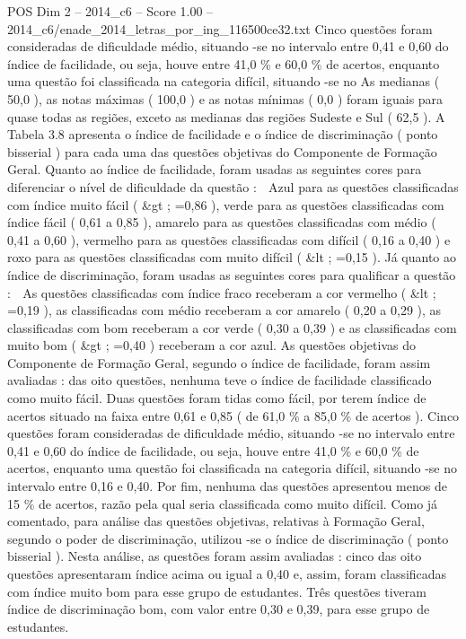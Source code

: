 \begin{textsample}{POS Dim 2 – 2014\_c6 – Score 1.00 – 2014\_c6/enade\_2014\_letras\_por\_ing\_116500ce32.txt}
Cinco questões foram consideradas de dificuldade médio, situando -se no intervalo entre 0,41 e 0,60 do índice de facilidade, ou seja, houve entre 41,0 \% e 60,0 \% de acertos, enquanto uma questão foi classificada na categoria difícil, situando -se no As medianas ( 50,0 ), as notas máximas ( 100,0 ) e as notas mínimas ( 0,0 ) foram iguais para quase todas as regiões, exceto as medianas das regiões Sudeste e Sul ( 62,5 ).
A Tabela 3.8 apresenta o índice de facilidade e o índice de discriminação ( ponto bisserial ) para cada uma das questões objetivas do Componente de Formação Geral.
Quanto ao índice de facilidade, foram usadas as seguintes cores para diferenciar o nível de dificuldade da questão :  Azul para as questões classificadas com índice muito fácil ( \&gt ; =0,86 ), verde para as questões classificadas com índice fácil ( 0,61 a 0,85 ), amarelo para as questões classificadas com médio ( 0,41 a 0,60 ), vermelho para as questões classificadas com difícil ( 0,16 a 0,40 ) e roxo para as questões classificadas com muito difícil ( \&lt ; =0,15 ).
Já quanto ao índice de discriminação, foram usadas as seguintes cores para qualificar a questão :  As questões classificadas com índice fraco receberam a cor vermelho ( \&lt ; =0,19 ), as classificadas com médio receberam a cor amarelo ( 0,20 a 0,29 ), as classificadas com bom receberam a cor verde ( 0,30 a 0,39 ) e as classificadas com muito bom ( \&gt ; =0,40 ) receberam a cor azul.
As questões objetivas do Componente de Formação Geral, segundo o índice de facilidade, foram assim avaliadas : das oito questões, nenhuma teve o índice de facilidade classificado como muito fácil.
Duas questões foram tidas como fácil, por terem índice de acertos situado na faixa entre 0,61 e 0,85 ( de 61,0 \% a 85,0 \% de acertos ).
Cinco questões foram consideradas de dificuldade médio, situando -se no intervalo entre 0,41 e 0,60 do índice de facilidade, ou seja, houve entre 41,0 \% e 60,0 \% de acertos, enquanto uma questão foi classificada na categoria difícil, situando -se no intervalo entre 0,16 e 0,40.
Por fim, nenhuma das questões apresentou menos de 15 \% de acertos, razão pela qual seria classificada como muito difícil.
Como já comentado, para análise das questões objetivas, relativas à Formação Geral, segundo o poder de discriminação, utilizou -se o índice de discriminação ( ponto bisserial ).
Nesta análise, as questões foram assim avaliadas : cinco das oito questões apresentaram índice acima ou igual a 0,40 e, assim, foram classificadas com índice muito bom para esse grupo de estudantes.
Três questões tiveram índice de discriminação bom, com valor entre 0,30 e 0,39, para esse grupo de estudantes.

\end{textsample}
